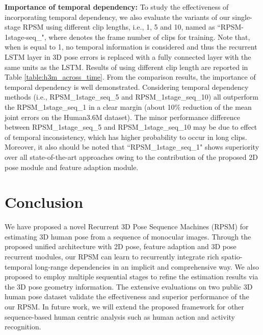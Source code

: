 \documentclass[10pt,twocolumn,letterpaper]{article}
\begin{document}
\textbf{Importance of temporal dependency:} To study the effectiveness of incorporating temporal dependency, we also evaluate the variants of our single-stage RPSM using different clip lengths, i.e., 1, 5 and 10, named as ``RPSM-1stage-seq\_", where  denotes the frame number of clips for training. Note that, when  is equal to 1, no temporal information is considered and thus the recurrent LSTM layer in 3D pose errors is replaced with a fully connected layer with the same units as the LSTM. 
Results of using different clip length are reported in Table \ref{table:h3m_across_time}. From the comparison results, the importance of temporal dependency is well demonstrated. Considering temporal dependency methods (i.e., RPSM\_1stage\_seq\_5 and RPSM\_1stage\_seq\_10) all outperform the RPSM\_1stage\_seq\_1 in a clear margin (about 10\% reduction of the mean joint errors on the Human3.6M dataset). The minor performance difference between RPSM\_1stage\_seq\_5 and RPSM\_1stage\_seq\_10 may be due to effect of temporal inconsistency, which has higher probability to occur in long clips. 
Moreover, it also should be noted that ``RPSM\_1stage\_seq\_1" shows superiority over all state-of-the-art approaches owing to the contribution of the proposed 2D pose module and feature adaption module.







\section{Conclusion}
We have proposed a novel Recurrent 3D Pose Sequence Machines (RPSM) for estimating 3D human pose from a sequence of monocular images. Through the proposed unified architecture with 2D pose, feature adaption and 3D pose recurrent modules, our RPSM can learn to recurrently integrate rich spatio-temporal long-range dependencies in an implicit and comprehensive way. We also proposed to employ multiple sequential stages to refine the estimation results via the 3D pose geometry information. The extensive evaluations on two public 3D human pose dataset validate the effectiveness and superior performance of the our RPSM. In future work, we will extend the proposed framework for other sequence-based human centric analysis such as human action and activity recognition.

{\small


}
\end{document}
